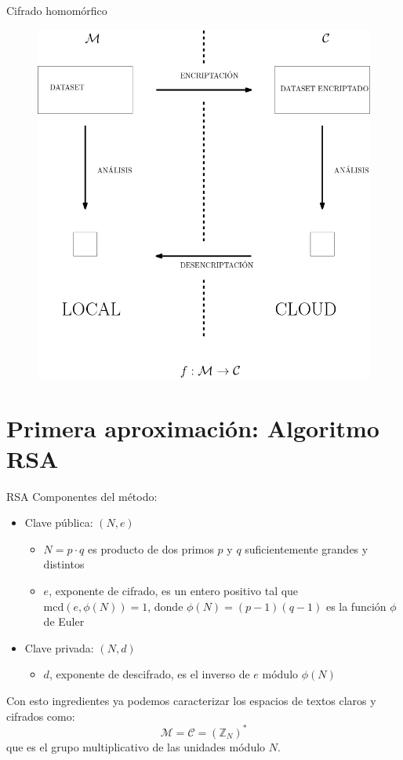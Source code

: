 \documentclass{beamer}
\begin{document}
\begin{frame}{Cifrado homomórfico}
    \begin{figure}[H]
    	\centering
		\includegraphics[scale=0.9]{IMG/diagrama}
	\end{figure}
\end{frame}

\section{Primera aproximación: Algoritmo RSA}
\begin{frame}{RSA}
    \justifying
    Componentes del método: 
    \begin{itemize}
    \item Clave pública: $(N,e)$
    \begin{itemize}
        \item $N = p \cdot q$ es producto de dos primos $p$ y $q$ suficientemente grandes y distintos 
        \item $e$, exponente de cifrado, es un entero positivo tal que $\mbox{mcd}(e,\phi(N)) = 1$, donde $\phi(N) = (p-1)(q-1)$ es la función $\phi$ de Euler
    \end{itemize}
    \item Clave privada: $(N,d)$ 
        \begin{itemize}
            \item $d$, exponente de descifrado, es el inverso de $e$ módulo $\phi(N)$
        \end{itemize}
    \end{itemize}
    Con esto ingredientes ya podemos caracterizar los espacios de textos claros y cifrados como: 
    $$ \mathcal{M} = \mathcal{C} = (\mathbb{Z}_N)^* $$
    que es el grupo multiplicativo de las unidades módulo $N$.  
\end{frame}
\end{document}
